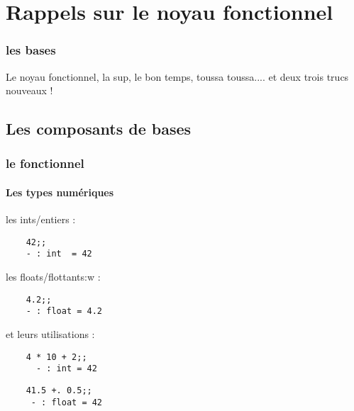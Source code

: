\section{Rappels sur le noyau fonctionnel}
\begin{frame}
  \begin{center}
    \frametitle{les bases}
  Le noyau fonctionnel, la sup, le bon temps, toussa toussa.... et deux trois trucs nouveaux !
  \end{center}
\end{frame}

\subsection{Les composants de bases}

\begin{frame}[fragile]
  \frametitle{le fonctionnel}
  \framesubtitle{Les types numériques}
   \begin{minipage}[t]{5cm}
    les ints/entiers : 
    \begin{lstlisting}
    42;;
    - : int  = 42
    \end{lstlisting}
   \end{minipage}
   \begin{minipage}[t]{5cm}
    les floats/flottants:w :
    \begin{lstlisting}
    4.2;;
    - : float = 4.2
    \end{lstlisting}
   \end{minipage}
   \vspace{0.5cm}
    et leurs utilisations :\\
   \begin{minipage}[t]{5cm}
     \begin{lstlisting}
    4 * 10 + 2;;
      - : int = 42
     \end{lstlisting}
   \end{minipage}
   \begin{minipage}[t]{5cm}
     \begin{lstlisting}
    41.5 +. 0.5;;
     - : float = 42
     \end{lstlisting}
   \end{minipage}
\end{frame}
